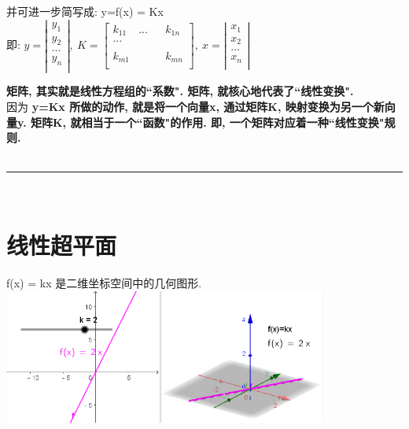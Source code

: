 \documentclass[UTF8]{ctexart}
\begin{document}
并可进一步简写成: y=f(x) = Kx \\
即:
$
y=\left| \begin{array}{l}
	y_1\\
	y_2\\
	...\\
	y_n\\
\end{array} \right|,\ K=\left[ \begin{matrix}
	k_{11}&		...&		&		k_{1n}\\
	...&		&		&		\\
	&		&		&		\\
	k_{m1}&		&		&		k_{mn}\\
\end{matrix} \right] ,\ x=\left| \begin{array}{l}
	x_1\\
	x_2\\
	...\\
	x_n\\
\end{array} \right|
$\\
\vspace{1em} 

\textbf{矩阵, 其实就是线性方程组的``系数". 矩阵, 就核心地代表了``线性变换".}\\
因为 \textbf{y=Kx 所做的动作, 就是将一个向量x, 通过矩阵K, 映射变换为另一个新向量y. 矩阵K, 就相当于一个``函数"的作用. 即, 一个矩阵对应着一种``线性变换"规则.} \\

~\\
\hrule
~\\

\section{线性超平面}


f(x) = kx 是二维坐标空间中的几何图形. \\

\includegraphics[width=0.8\textwidth]{img/0112.png}\\
\end{document}
